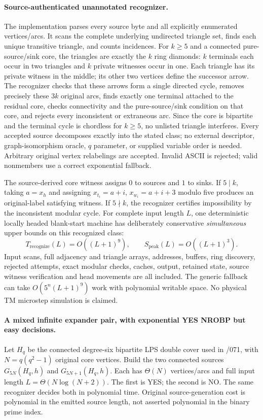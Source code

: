 \documentclass[11pt]{article}
\begin{document}
\paragraph{Source-authenticated unannotated recognizer.}
The implementation parses every source byte and all explicitly enumerated vertices/arcs. It scans the complete underlying undirected triangle set, finds each unique transitive triangle, and counts incidences. For $k\ge5$ and a connected pure-source/sink core, the triangles are exactly the $k$ ring diamonds: $k$ terminals each occur in two triangles and $k$ private witnesses occur in one. Each triangle has its private witness in the middle; its other two vertices define the successor arrow. The recognizer checks that these arrows form a single directed cycle, removes precisely these $3k$ original arcs, finds exactly one terminal attached to the residual core, checks connectivity and the pure-source/sink condition on that core, and rejects every inconsistent or extraneous arc. Since the core is bipartite and the terminal cycle is chordless for $k\ge5$, no unlisted triangle interferes. Every accepted source decomposes exactly into the stated class; no external descriptor, graph-isomorphism oracle, $q$ parameter, or supplied variable order is needed. Arbitrary original vertex relabelings are accepted. Invalid ASCII is rejected; valid nonmembers use a correct exponential fallback.

The source-derived core witness assigns $0$ to sources and $1$ to sinks. If $5\mid k$, taking $a=x_h$ and assigning $x_{t_i}=a+i$, $x_{w_i}=a+i+3$ modulo five produces an original-label satisfying witness. If $5\nmid k$, the recognizer certifies impossibility by the inconsistent modular cycle. For complete input length $L$, one deterministic locally headed blank-start machine has deliberately conservative \emph{simultaneous} upper bounds on this recognized class:
\[
 T_{\mathrm{recognize}}(L)=O((L+1)^9),\qquad
 S_{\mathrm{peak}}(L)=O((L+1)^3).
\]
Input scans, full adjacency and triangle arrays, addresses, buffers, ring discovery, rejected attempts, exact modular checks, caches, output, retained state, source witness verification and head movements are all included. The generic fallback can take $O(5^n(L+1)^9)$ work with polynomial writable space. No physical TM microstep simulation is claimed.

\paragraph{A mixed infinite expander pair, with exponential YES NROBP but easy decisions.}
Let $H_q$ be the connected degree-six bipartite LPS double cover used in /071, with $N=q(q^2-1)$ original core vertices. Build the two connected sources $G_{5N}(H_q,h)$ and $G_{5N+1}(H_q,h)$. Each has $\Theta(N)$ vertices/arcs and full input length $L=\Theta(N\log(N+2))$. The first is YES; the second is NO. The same recognizer decides both in polynomial time. Original source-generation cost is polynomial in the emitted source length, not asserted polynomial in the binary prime index.
\end{document}
